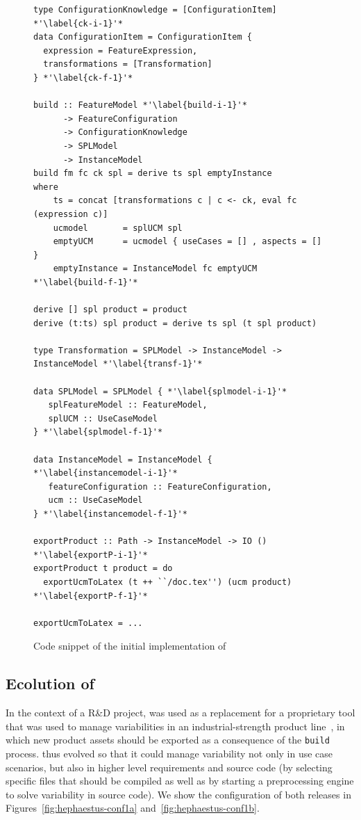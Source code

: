 \begin{figure}
\begin{lstlisting}
type ConfigurationKnowledge = [ConfigurationItem] *'\label{ck-i-1}'*
data ConfigurationItem = ConfigurationItem {
  expression = FeatureExpression,
  transformations = [Transformation]
} *'\label{ck-f-1}'*

build :: FeatureModel *'\label{build-i-1}'*
      -> FeatureConfiguration
      -> ConfigurationKnowledge
      -> SPLModel
      -> InstanceModel
build fm fc ck spl = derive ts spl emptyInstance
where
    ts = concat [transformations c | c <- ck, eval fc (expression c)]
    ucmodel       = splUCM spl
    emptyUCM      = ucmodel { useCases = [] , aspects = [] }
    emptyInstance = InstanceModel fc emptyUCM *'\label{build-f-1}'*

derive [] spl product = product
derive (t:ts) spl product = derive ts spl (t spl product)

type Transformation = SPLModel -> InstanceModel -> InstanceModel *'\label{transf-1}'*

data SPLModel = SPLModel { *'\label{splmodel-i-1}'*
   splFeatureModel :: FeatureModel,
   splUCM :: UseCaseModel
} *'\label{splmodel-f-1}'*

data InstanceModel = InstanceModel { *'\label{instancemodel-i-1}'*
   featureConfiguration :: FeatureConfiguration,
   ucm :: UseCaseModel
} *'\label{instancemodel-f-1}'*

exportProduct :: Path -> InstanceModel -> IO () *'\label{exportP-i-1}'*
exportProduct t product = do
  exportUcmToLatex (t ++ ``/doc.tex'') (ucm product) *'\label{exportP-f-1}'*

exportUcmToLatex = ...
\end{lstlisting}
\caption{Code snippet of the initial implementation of \hp}
\label{fig:hephaestus-initial-code}
\end{figure}


\subsection{Ecolution of \hp} 
\label{hp-evolution}

In the context of a R\&D project, \hp{} was used as a replacement
for a proprietary tool that was used to manage variabilities in an
industrial-strength product line~\cite{ferreira:2010}, in which new
product assets should be exported as a consequence of the
\texttt{build} process. \hp{} thus evolved so that it could
manage variability not only in use case scenarios, but also in higher
level requirements and source code (by selecting specific files that
should be compiled as well as by starting a preprocessing engine to
solve variability in source code). We show the configuration of both
releases in Figures~\ref{fig:hephaestus-conf1a}
and~\ref{fig:hephaestus-conf1b}.


